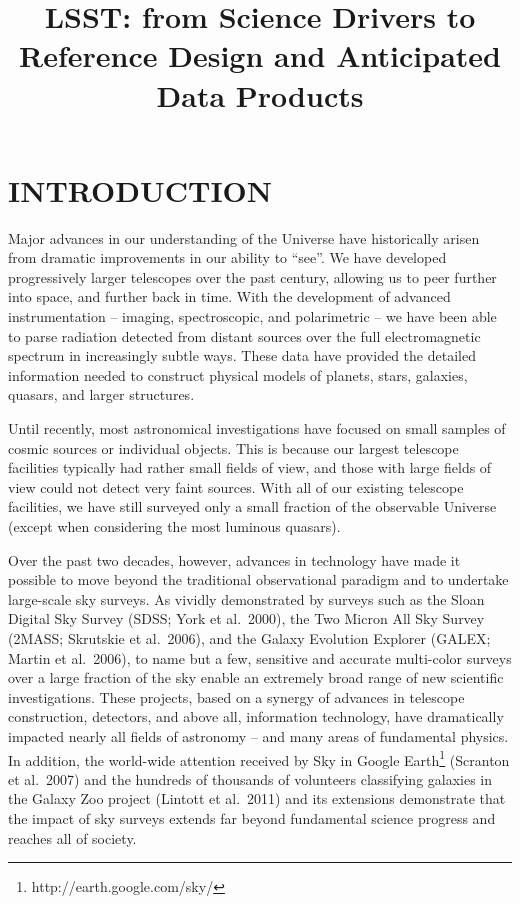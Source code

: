 \documentclass{emulateapj}
\begin{document}
\title{LSST: from Science Drivers to Reference Design and Anticipated Data Products} 






\section{INTRODUCTION}
 
Major advances in our understanding of the Universe have historically arisen
from dramatic improvements in our ability to ``see''. We have developed
progressively larger telescopes over the past century, allowing us 
to peer further into space, and further back in time. With the development of 
advanced instrumentation -- imaging, spectroscopic, and polarimetric -- we 
have been able to parse radiation detected from distant sources over the 
full electromagnetic spectrum in increasingly subtle ways. 
These data have provided the detailed information needed to construct physical 
models of planets, stars, galaxies, quasars, and larger structures. 

Until recently, most astronomical investigations have focused on small samples 
of cosmic sources or individual objects. This is because our largest telescope 
facilities typically had rather small fields of view, and those with large
fields of view could not detect very faint sources. With all of our existing 
telescope facilities, we have still surveyed only a small fraction of the 
observable Universe (except when considering the most luminous quasars). 

Over the past two decades, however, advances in technology have made it possible to 
move beyond the traditional observational paradigm and to undertake large-scale 
sky surveys. As vividly demonstrated by surveys such as the Sloan Digital Sky 
Survey (SDSS; York et al.~2000), the Two Micron All Sky Survey (2MASS;
Skrutskie et al.~2006), and the Galaxy Evolution Explorer (GALEX; Martin et
al.~2006), to name but a few, sensitive and accurate 
multi-color surveys over a large fraction of the sky enable an extremely broad range of 
new scientific investigations. These projects, based on a synergy of advances in 
telescope construction, detectors, and above all, information technology, 
have dramatically impacted nearly all fields of astronomy 
-- and many areas of fundamental physics. In addition, the world-wide attention 
received by Sky in Google Earth\footnote{http://earth.google.com/sky/}
(Scranton et al.~2007)  and the hundreds of thousands of volunteers
classifying galaxies in the Galaxy Zoo project (Lintott et al.~2011)
and its extensions 
demonstrate that the impact of sky surveys extends
far beyond fundamental science progress and reaches all of society.
\end{document}
